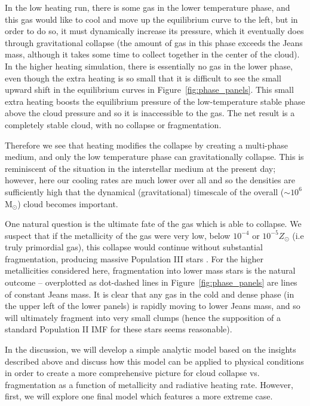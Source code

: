 \documentclass[useAMS,usenatbib]{mn2e}
\newcommand{\msun}{{M$_\odot$}}
\begin{document}
In the low heating run, there is some gas in the lower temperature phase, and this gas would like to cool and move up the equilibrium curve to the left, but in order to do so, it must dynamically increase its pressure, which it eventually does through gravitational collapse (the amount of gas in this phase exceeds the Jeans mass, although it takes some time to collect together in the center of the cloud).  In the higher heating simulation, there is essentially no gas in the lower phase, even though the extra heating is so small that it is difficult to see the small upward shift in the equilibrium curves in Figure~\ref{fig:phase_panels}.  This small extra heating boosts the equilibrium pressure of the low-temperature stable phase above the cloud pressure and so it is inaccessible to the gas.  The net result is a completely stable cloud, with no collapse or fragmentation.

Therefore we see that heating modifies the collapse by creating a multi-phase medium, and only the low temperature phase can gravitationally collapse.  This is reminiscent of the situation in the interstellar medium at the present day; however, here our cooling rates are much lower over all and so the densities are sufficiently high that the dynamical (gravitational) timescale of the overall ($\sim 10^6$ \msun) cloud becomes important.

One natural question is the ultimate fate of the gas which is able to collapse.  We suspect that if the metallicity of the gas were very low, below $10^{-4}$ or $10^{-5} Z_\odot$ (i.e truly primordial gas), this collapse would continue without substantial fragmentation, producing massive Population III stars \citep[e.g.,][]{ABN2002}.  For the higher metallicities considered here, fragmentation into lower mass stars is the natural outcome -- overplotted as dot-dashed lines in Figure~\ref{fig:phase_panels} are lines of constant Jeans mass.  It is clear that any gas in the cold and dense phase (in the upper left of the lower panels) is rapidly moving to lower Jeans mass, and so will ultimately fragment into very small clumps (hence the supposition of a standard Population II IMF for these stars seems reasonable).

In the discussion, we will develop a simple analytic model based on the insights described above and discuss how this model can be applied to physical conditions in order to create a more comprehensive picture for cloud collapse vs. fragmentation as a function of metallicity and radiative heating rate.  However, first, we will explore one final model which features a more extreme case.
\end{document}

